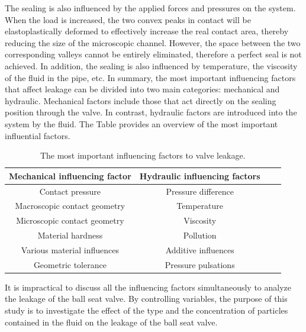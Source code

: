  The sealing is also influenced by the applied forces and pressures on the system. When the load is increased,
  the two convex peaks in contact will be elastoplastically deformed to effectively increase the real contact area, 
  thereby reducing the size of the microscopic channel. However, the space between 
 the two corresponding valleys cannot be entirely eliminated, therefore a perfect seal is not achieved.\cite{Sealing2}
 In addition, the sealing is also influenced by temperature, the viscosity of the fluid in the pipe, etc. 
 In summary, the most important influencing factors that affect leakage can be divided into two main 
 categories: mechanical and hydraulic. Mechanical factors include those that act directly on the sealing 
 position through the valve. In contrast, hydraulic factors are introduced into 
 the system by the fluid. The Table  provides an overview of the most 
 important influential factors. \cite{PhD-M.S}


    \begin{table}[h!]
        \centering
        \begin{tabular}{||c| c |c |c||} 
         \hline
         Mechanical influencing factor & Hydraulic influencing factors  \\ [0.5ex] 
         \hline\hline
         Contact pressure  & Pressure difference  \\ 
         Macroscopic contact geometry & Temperature  \\
         Microscopic contact geometry & Viscosity \\
         Material hardness & Pollution \\
         Various material influences & Additive influences \\
         Geometric tolerance & Pressure pulsations\\[1ex] 
         \hline
        \end{tabular}
        \caption{The most important influencing factors to valve leakage.\cite{PhD-M.S}}
        \label{tab:influencing factors to valve}
        \end{table}

        It is impractical to discuss all the influencing factors simultaneously to analyze 
        the leakage of the ball seat valve. By controlling variables, the purpose of this study
         is to investigate the effect of the type and the 
        concentration of particles contained in the fluid on the leakage of the ball seat valve.